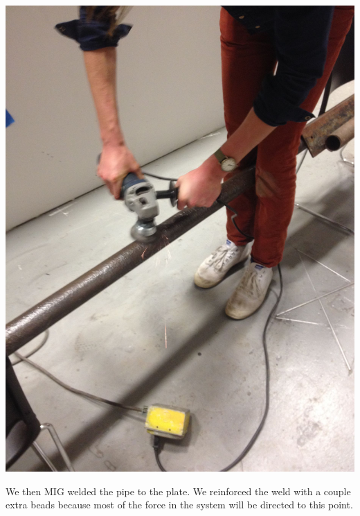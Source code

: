 \documentclass[11pt]{article} %
\begin{document}
\begin{center}
\includegraphics[scale=0.12]{roofmount/03.jpeg}
\end{center}


We then MIG welded the pipe to the plate. We reinforced the weld with a couple extra beads because most of the force in the system will be directed to this point.
\end{document}

